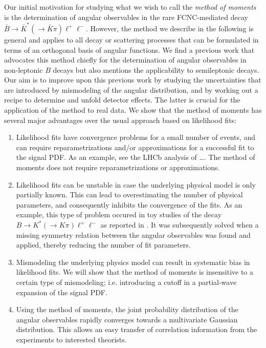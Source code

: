 \documentclass[aps,prd,reprint,nofootinbib,preprintnumbers]{revtex4}
\newcommand{\add}[1]{\textcolor{green!85!black}{#1}}
\begin{document}
Our initial motivation for studying what we wish to call the
\emph{method of moments} is the determination of angular observables
in the rare FCNC-mediated decay $\bar{B}\to \bar{K}^*(\to
\bar{K}\pi)\ell^+\ell^-$. However, the method we describe in the
following is general and applies to all decay or scattering
processes that can be formulated in terms of an orthogonal basis of angular functions.
We find a previous work \cite{Dighe:1998vk} that
advocates this method chiefly for the determination of angular
observables in non-leptonic $B$ decays but also mentions the
applicability to semileptonic decays. Our aim is to improve upon this
previous work by studying the uncertainties that are introduced by
mismodeling of the angular distribution, and by working out a recipe
to determine and unfold detector effects. The latter is crucial for
the application of the method to real data. We show that
the method of moments has several major advantages over the usual approach
based on likelihood fits:
\begin{enumerate}
    \item Likelihood fits have convergence problems for a small number of
        events, and can require reparametrizations and/or approximations
        for a successful fit to the signal PDF. \add{As an example,
        see the LHCb analysis of \dots}.
        The method of moments does not require reparametrizations or approximations.

    \item \add{Likelihood fits  can be unstable in case the underlying
        physical model is only partially known. This can lead to
        overestimating the number of physical parameters, and consequently
        inhibits the convergence of the fits. As an example, this type
        of problem occured in toy studies of the decay $B\to K^*(\to K\pi)\ell^+\ell^-$
        as reported in \cite{Egede:1142152}. It was subsequently solved
        when a missing symmetry relation between the angular observables
        was found and applied, thereby reducing the number of fit parameters.
    }
    \item Mismodeling the underlying physics model can result in systematic bias
        in likelihood fits. We will
        show that the method of moments is insensitive to a certain type of mismodeling;
        i.e. introducing a cutoff in a partial-wave expansion of the signal PDF.

    \item Using the method of moments, the joint probability distribution of the
        angular observables rapidly converges towards a multivariate Gaussian distribution.
        This allows an easy transfer of correlation information from the experiments to
        interested theorists.
\end{enumerate}
\end{document}
